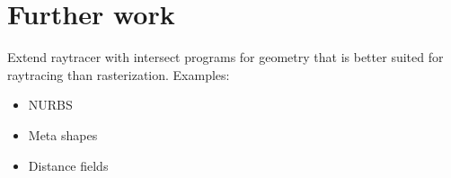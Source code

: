 \section{Further work}

Extend raytracer with intersect programs for geometry that is better suited for raytracing than rasterization. Examples:
\begin{itemize}
	\item NURBS
  \item Meta shapes
  \item Distance fields
\end{itemize}